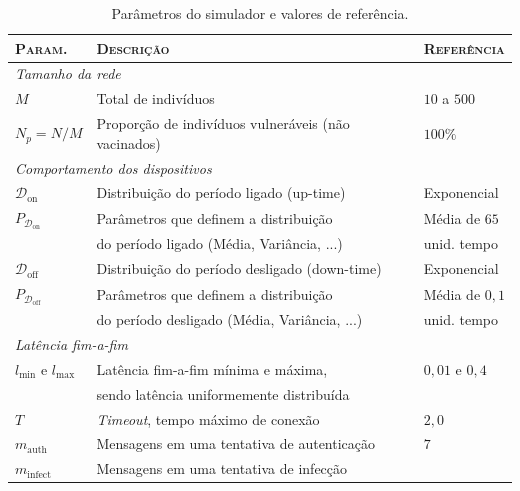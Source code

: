 	\begin{table}[!htb]
		\footnotesize
	\centering
		\caption{Parâmetros  do  simulador e  valores de referência.}
	\begin{tabular}{lll}
	        \textsc{Param.} & 
	        \textsc{Descrição} & 
	       \textsc{Referência}\\ 
	        \hline
	        \hline
	        \multicolumn{3}{l}{\emph{Tamanho da rede}} \\
	        $M$ & 
	        Total de indivíduos &  
	        $10$ a $500$ \\
	        \hline
	        $N_p=N/M$ & 
	        Proporção de indivíduos vulneráveis (não vacinados) 
	        & $100\%$ \\
	        \hline
	        \hline
	        \multicolumn{3}{l}{\emph{Comportamento dos dispositivos}} \\
	        $\mathcal{D}_\textrm{on}$ & 
	        Distribuição do período ligado (up-time) &
	        Exponencial \\
	        \hline
	        $P_{\mathcal{D}_{\textrm{on}}}$ & 
	        Parâmetros que definem a distribuição &
	        Média de $65$ \\
	         & 
	         do período ligado (Média, Variância, ...) & 
	         unid. tempo\\
	        \hline
	        $\mathcal{D}_\textrm{off}$ & 
	        Distribuição do período desligado  (down-time) &
	        Exponencial \\
	        \hline
	        $P_{\mathcal{D}_\textrm{off}}$ & 
	                Parâmetros que definem a distribuição &
	        Média de $0,1$ \\
	         & 
	         do período desligado (Média, Variância, ...) & 
	         unid. tempo\\
	        \hline
	        \hline
	        \multicolumn{3}{l}{\emph{Latência fim-a-fim}} \\
	        $l_\textrm{min}$ e $ l_\mathrm{max}$ & 
	        Latência fim-a-fim mínima e máxima,  & $
	        0,01$ e $0,4$ \\
	         & sendo latência uniformemente distribuída & \\
	        \hline
	        $T$ & 
	        \textit{Timeout}, tempo máximo de conexão 
	        & $2,0$ \\
	        \hline
	        $m_\textrm{auth}$ & 
	        Mensagens em uma tentativa de autenticação & 
	        $7$\\
	        \hline
	        $m_\textrm{infect}$ & 
	        Mensagens em uma tentativa de infecção & 

\end{tabular}
\end{table}
